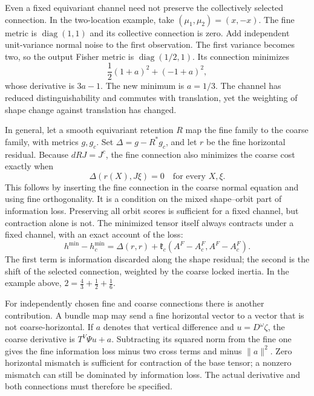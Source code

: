 Even a fixed equivariant channel need not preserve the collectively selected connection. In the two-location example, take $(\mu_1,\mu_2)=(x,-x)$. The fine metric is $\operatorname{diag}(1,1)$ and its collective connection is zero. Add independent unit-variance normal noise to the first observation. The first variance becomes two, so the output Fisher metric is $\operatorname{diag}(1/2,1)$. Its connection minimizes
\begin{equation}
\frac12(1+a)^2+(-1+a)^2,
\end{equation}
whose derivative is $3a-1$. The new minimum is $a=1/3$. The channel has reduced distinguishability and commutes with translation, yet the weighting of shape change against translation has changed.

In general, let a smooth equivariant retention $R$ map the fine family to the coarse family, with metrics $g,g_c$. Set $\Delta=g-R^*g_c$, and let $r$ be the fine horizontal residual. Because $dR J=J^c$, the fine connection also minimizes the coarse cost exactly when
\begin{equation}
\Delta(r(X),J\xi)=0
\quad\text{for every }X,\xi.
\end{equation}
This follows by inserting the fine connection in the coarse normal equation and using fine orthogonality. It is a condition on the mixed shape--orbit part of information loss. Preserving all orbit scores is sufficient for a fixed channel, but contraction alone is not. The minimized tensor itself always contracts under a fixed channel, with an exact account of the loss:
\begin{equation}
h^{\min}-h^{\min}_c=\Delta(r,r)+\mathfrak k_c(A^F-A^F_c,A^F-A^F_c).
\end{equation}
The first term is information discarded along the shape residual; the second is the shift of the selected connection, weighted by the coarse locked inertia. In the example above, $2=\tfrac43+\tfrac12+\tfrac16$.

For independently chosen fine and coarse connections there is another contribution. A bundle map may send a fine horizontal vector to a vector that is not coarse-horizontal. If $a$ denotes that vertical difference and $u=D^\omega\zeta$, the coarse derivative is $T^V\Psi u+a$. Subtracting its squared norm from the fine one gives the fine information loss minus two cross terms and minus $\|a\|^2$. Zero horizontal mismatch is sufficient for contraction of the base tensor; a nonzero mismatch can still be dominated by information loss. The actual derivative and both connections must therefore be specified.

